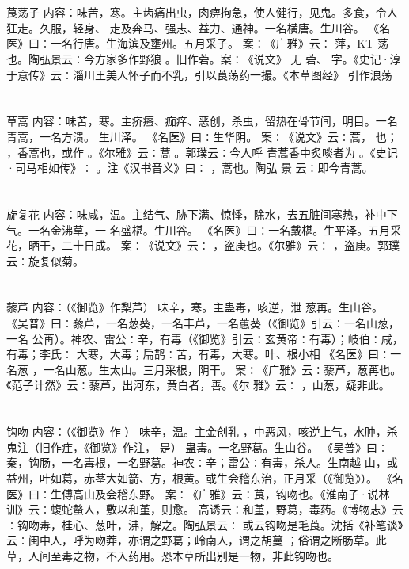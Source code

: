 \documentclass[12pt,UTF8]{ctexbook}
\begin{document}
\section{}莨荡子
内容：味苦，寒。主齿痛出虫，肉痹拘急，使人健行，见鬼。多食，令人狂走。久服，轻身、 
走及奔马、强志、益力、通神。一名横唐。生川谷。 
《名医》曰∶一名行唐。生海滨及壅州。五月采子。 
案∶《广雅》云∶ 萍，KT 荡也。陶弘景云∶今方家多作野狼 。旧作菪。案∶《说文》 
无 
菪、 字。《史记·淳于意传》云∶淄川王美人怀子而不乳，引以莨荡药一撮。《本草图经》 
引作浪荡 


\section{}草蒿
内容：味苦，寒。主疥瘙、痂痒、恶创，杀虫，留热在骨节间，明目。一名青蒿，一名方溃。 
生川泽。 
《名医》曰∶生华阴。 
案∶《说文》云∶蒿， 也； ，香蒿也，或作 。《尔雅》云∶蒿 。郭璞云∶今人呼 
青蒿香中炙啖者为 。《史记·司马相如传》∶ 。注《汉书音义》曰∶ ，蒿也。陶弘 
景 
云∶即今青蒿。 


\section{}旋复花
内容：味咸，温。主结气、胁下满、惊悸，除水，去五脏间寒热，补中下气。一名金沸草，一 
名盛椹。生川谷。 
《名医》曰∶一名戴椹。生平泽。五月采花，晒干，二十日成。 
案∶《说文》云∶ ，盗庚也。《尔雅》云∶ ，盗庚。郭璞云∶旋复似菊。 


\section{}藜芦
内容：（《御览》作梨芦） 
味辛，寒。主蛊毒，咳逆，泄 
葱苒。生山谷。 
《吴普》曰∶藜芦，一名葱葵，一名丰芦，一名蕙葵（《御览》引云∶一名山葱，一名 
公苒）。神农、雷公∶辛，有毒（《御览》引云∶玄黄帝∶有毒）；岐伯∶咸，有毒；李氏∶ 
大寒，大毒；扁鹊∶苦，有毒，大寒。叶、根小相 
《名医》曰∶一名葱 ，一名山葱。生太山。三月采根，阴干。 
案∶《广雅》云∶藜芦，葱苒也。《范子计然》云∶藜芦，出河东，黄白者，善。《尔 
雅》云∶ ，山葱，疑非此。 


\section{}钩吻
内容：（《御览》作 ） 
味辛，温。主金创乳 ，中恶风，咳逆上气，水肿，杀鬼注（旧作疰，《御览》作注， 
是） 
蛊毒。一名野葛。生山谷。 
《吴普》曰∶秦，钩肠，一名毒根，一名野葛。神农∶辛；雷公∶有毒，杀人。生南越 
山，或益州，叶如葛，赤茎大如箭、方，根黄。或生会稽东治，正月采（《御览》）。 
《名医》曰∶生傅高山及会稽东野。 
案∶《广雅》云∶莨，钩吻也。《淮南子·说林训》云∶蝮蛇螫人，敷以和堇，则愈。 
高诱云∶和堇，野葛，毒药。《博物志》云∶钩吻毒，桂心、葱叶，沸，解之。陶弘景云∶ 
或云钩吻是毛莨。沈括《补笔谈》云∶闽中人，呼为吻莽，亦谓之野葛；岭南人，谓之胡蔓 
；俗谓之断肠草。此草，人间至毒之物，不入药用。恐本草所出别是一物，非此钩吻也。 
\end{document}
